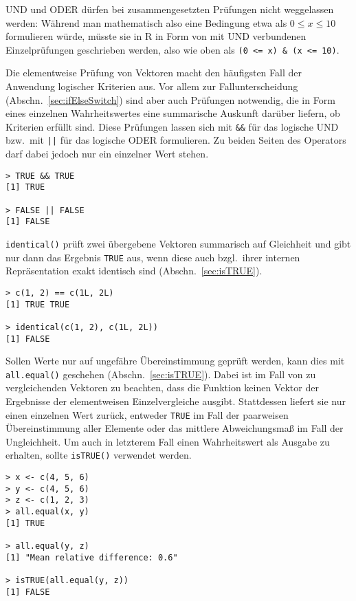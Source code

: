 UND und ODER dürfen bei zusammengesetzten Prüfungen nicht weggelassen werden: Während man mathematisch also eine Bedingung etwa als $0 \leq x \leq 10$ formulieren würde, müsste sie in R in Form von mit UND verbundenen Einzelprüfungen geschrieben werden, also wie oben als \lstinline!(0 <= x) & (x <= 10)!.

Die elementweise Prüfung von Vektoren macht den häufigsten Fall der Anwendung logischer Kriterien aus. Vor allem zur Fallunterscheidung (Abschn.\ \ref{sec:ifElseSwitch}) sind aber auch Prüfungen notwendig, die in Form eines einzelnen Wahrheitswertes eine summarische Auskunft darüber liefern, ob Kriterien erfüllt sind. Diese Prüfungen lassen sich mit \lstinline!&&! für das logische UND bzw.\ mit\index[func]{\textbar@\texttt{\textbar, \textbar\textbar}} \lstinline!||! für das logische ODER formulieren. Zu beiden Seiten des Operators darf dabei jedoch nur ein einzelner Wert stehen.
\begin{lstlisting}
> TRUE && TRUE
[1] TRUE

> FALSE || FALSE
[1] FALSE
\end{lstlisting}

\lstinline!identical()! prüft zwei übergebene Vektoren summarisch auf Gleichheit und gibt nur dann das Ergebnis \lstinline!TRUE! aus, wenn diese auch bzgl.\ ihrer internen Repräsentation exakt identisch sind (Abschn.\ \ref{sec:isTRUE}).
\begin{lstlisting}
> c(1, 2) == c(1L, 2L)
[1] TRUE TRUE

> identical(c(1, 2), c(1L, 2L))
[1] FALSE
\end{lstlisting}

Sollen Werte nur auf ungefähre Übereinstimmung geprüft werden, kann dies mit \lstinline!all.equal()! geschehen (Abschn.\ \ref{sec:isTRUE}). Dabei ist im Fall von zu vergleichenden Vektoren zu beachten, dass die Funktion keinen Vektor der Ergebnisse der elementweisen Einzelvergleiche ausgibt. Stattdessen liefert sie nur einen einzelnen Wert zurück, entweder \lstinline!TRUE! im Fall der paarweisen Übereinstimmung aller Elemente oder das mittlere Abweichungsmaß im Fall der Ungleichheit. Um auch in letzterem Fall einen Wahrheitswert als Ausgabe zu erhalten, sollte \lstinline!isTRUE()! verwendet werden.
\begin{lstlisting}
> x <- c(4, 5, 6)
> y <- c(4, 5, 6)
> z <- c(1, 2, 3)
> all.equal(x, y)
[1] TRUE

> all.equal(y, z)
[1] "Mean relative difference: 0.6"

> isTRUE(all.equal(y, z))
[1] FALSE
\end{lstlisting}

